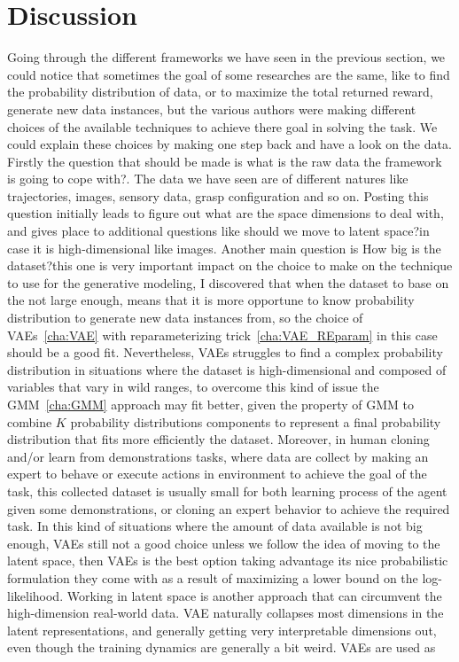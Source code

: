 

\pagestyle{fancy} 
\chapter{Discussion}
\label{cha:3}
\vspace{1cm}

Going through the different frameworks we have seen in the previous section, we could notice that sometimes the goal of some researches are the same, like to find the probability distribution of data, or to maximize the total returned reward, generate new data instances, but the various authors were making different choices of the available techniques to achieve there goal in solving the task. We could explain these choices by making one step back and have a look on the data. Firstly the question that should be made is \textacutedbl what is the raw data the framework is going to cope with?\textgravedbl. The data we have seen are of different natures like trajectories, images, sensory data, grasp configuration and so on. Posting this question initially leads to figure out what are the space dimensions to deal with, and gives place to additional questions like \textacutedbl should we move to latent space?\textgravedbl in case it is high-dimensional like images. Another main question is \textacutedbl How big is the dataset?\textgravedbl this one is very important impact on the choice to make on the technique to use for the generative modeling, I discovered that when the dataset to base on the not large enough, means that it is more opportune to know probability distribution to generate new data instances from, so the choice of VAEs~\ref{cha:VAE} with reparameterizing trick~\ref{cha:VAE_REparam} in this case should be a good fit. Nevertheless, VAEs struggles to find a complex probability distribution in situations where the dataset is high-dimensional and composed of variables that vary in wild ranges, to overcome this kind of issue the GMM~\ref{cha:GMM} approach may fit better, given the property of GMM to combine $K$ probability distributions components to represent a final probability distribution that fits more efficiently the dataset. Moreover, in human cloning and/or learn from demonstrations tasks, where data are collect by making an expert to behave or execute actions in environment to achieve the goal of the task, this collected dataset is usually small for both learning process of the agent given some demonstrations, or cloning an expert behavior to achieve the required task. In this kind of situations where the amount of data available is not big enough, VAEs still not a good choice unless we follow the idea of moving to the latent space, then VAEs is the best option taking advantage its nice probabilistic formulation they come with as a result of maximizing a lower bound on the log-likelihood. Working in latent space is another approach that can circumvent the high-dimension real-world data. VAE naturally collapses most dimensions in the latent representations, and generally getting very interpretable dimensions out, even though the training dynamics are generally a bit weird. VAEs are used as 